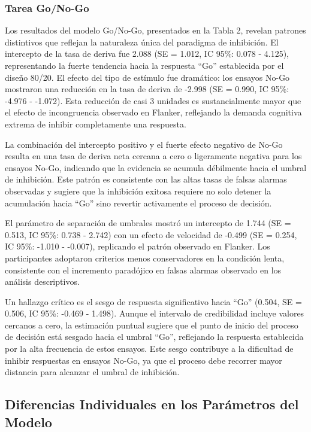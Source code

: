 \documentclass[
  spanish,
  10pt,
]{article}
\begin{document}
\subsubsection{Tarea Go/No-Go}\label{tarea-gono-go}

Los resultados del modelo Go/No-Go, presentados en la Tabla 2, revelan
patrones distintivos que reflejan la naturaleza única del paradigma de
inhibición. El intercepto de la tasa de deriva fue 2.088 (SE = 1.012, IC
95\%: 0.078 - 4.125), representando la fuerte tendencia hacia la
respuesta ``Go'' establecida por el diseño 80/20. El efecto del tipo de
estímulo fue dramático: los ensayos No-Go mostraron una reducción en la
tasa de deriva de -2.998 (SE = 0.990, IC 95\%: -4.976 - -1.072). Esta
reducción de casi 3 unidades es sustancialmente mayor que el efecto de
incongruencia observado en Flanker, reflejando la demanda cognitiva
extrema de inhibir completamente una respuesta.

La combinación del intercepto positivo y el fuerte efecto negativo de
No-Go resulta en una tasa de deriva neta cercana a cero o ligeramente
negativa para los ensayos No-Go, indicando que la evidencia se acumula
débilmente hacia el umbral de inhibición. Este patrón es consistente con
las altas tasas de falsas alarmas observadas y sugiere que la inhibición
exitosa requiere no solo detener la acumulación hacia ``Go'' sino
revertir activamente el proceso de decisión.

El parámetro de separación de umbrales mostró un intercepto de 1.744 (SE
= 0.513, IC 95\%: 0.738 - 2.742) con un efecto de velocidad de -0.499
(SE = 0.254, IC 95\%: -1.010 - -0.007), replicando el patrón observado
en Flanker. Los participantes adoptaron criterios menos conservadores en
la condición lenta, consistente con el incremento paradójico en falsas
alarmas observado en los análisis descriptivos.

Un hallazgo crítico es el sesgo de respuesta significativo hacia ``Go''
(0.504, SE = 0.506, IC 95\%: -0.469 - 1.498). Aunque el intervalo de
credibilidad incluye valores cercanos a cero, la estimación puntual
sugiere que el punto de inicio del proceso de decisión está sesgado
hacia el umbral ``Go'', reflejando la respuesta establecida por la alta
frecuencia de estos ensayos. Este sesgo contribuye a la dificultad de
inhibir respuestas en ensayos No-Go, ya que el proceso debe recorrer
mayor distancia para alcanzar el umbral de inhibición.

\subsection{Diferencias Individuales en los Parámetros del
Modelo}\label{diferencias-individuales-en-los-paruxe1metros-del-modelo}
\end{document}
